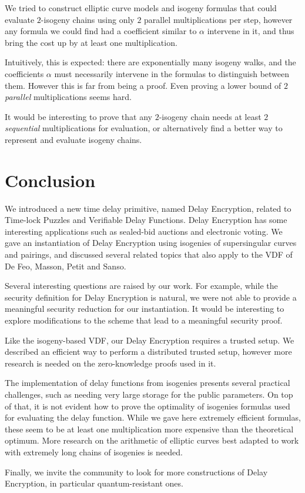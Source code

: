 \documentclass{llncs}
\begin{document}
We tried to construct elliptic curve models and isogeny formulas that
could evaluate $2$-isogeny chains using only $2$ parallel
multiplications per step, however any formula we could find had a
coefficient similar to $\alpha$ intervene in it, and thus bring the
cost up by at least one multiplication.

Intuitively, this is expected: there are exponentially many isogeny
walks, and the coefficients $\alpha$ must necessarily intervene in the
formulas to distinguish between them. %
However this is far from being a proof. %
Even proving a lower bound of $2$ \emph{parallel} multiplications
seems hard.

It would be interesting to prove that any $2$-isogeny chain needs at
least $2$ \emph{sequential} multiplications for evaluation, or
alternatively find a better way to represent and evaluate isogeny
chains.


\section{Conclusion}

We introduced a new time delay primitive, named Delay Encryption,
related to Time-lock Puzzles and Verifiable Delay Functions. %
Delay Encryption has some interesting applications such as sealed-bid
auctions and electronic voting. %
We gave an instantiation of Delay Encryption using isogenies of
supersingular curves and pairings, and discussed several related
topics that also apply to the VDF of De Feo, Masson, Petit and Sanso.

Several interesting questions are raised by our work. %
For example, while the security definition for Delay Encryption is
natural, we were not able to provide a meaningful security reduction
for our instantiation. %
It would be interesting to explore modifications to the scheme that
lead to a meaningful security proof.

Like the isogeny-based VDF, our Delay Encryption requires a trusted
setup. %
We described an efficient way to perform a distributed trusted setup,
however more research is needed on the zero-knowledge proofs used in
it.

The implementation of delay functions from isogenies presents several
practical challenges, such as needing very large storage for the
public parameters. %
On top of that, it is not evident how to prove the optimality of
isogenies formulas used for evaluating the delay function. %
While we gave here extremely efficient formulas, these seem to be at
least one multiplication more expensive than the theoretical
optimum. %
More research on the arithmetic of elliptic curves best adapted to
work with extremely long chains of isogenies is needed.

Finally, we invite the community to look for more constructions of
Delay Encryption, in particular quantum-resistant ones.

\def\doi#1{\href{https://doi.org/#1}{\tt https://doi.org/\nolinkurl{#1}}}


\end{document}
